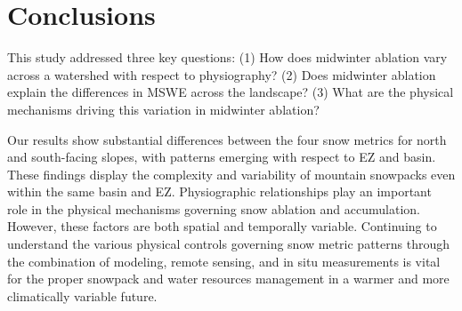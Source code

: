 \hypertarget{ch2-conclusions}{\section{Conclusions}\label{ch2-conclusions}}

This study addressed three key questions: (1) How does midwinter ablation vary across a watershed with respect to physiography? (2) Does midwinter ablation explain the differences in MSWE across the landscape? (3) What are the physical mechanisms driving this variation in midwinter ablation?

Our results show substantial differences between the four snow metrics for north and south-facing slopes, with patterns emerging with respect to EZ and basin. These findings display the complexity and variability of mountain snowpacks even within the same basin and EZ. Physiographic relationships play an important role in the physical mechanisms governing snow ablation and accumulation. However, these factors are both spatial and temporally variable. Continuing to understand the various physical controls governing snow metric patterns through the combination of modeling, remote sensing, and in situ measurements is vital for the proper snowpack and water resources management in a warmer and more climatically variable future.

\clearpage


